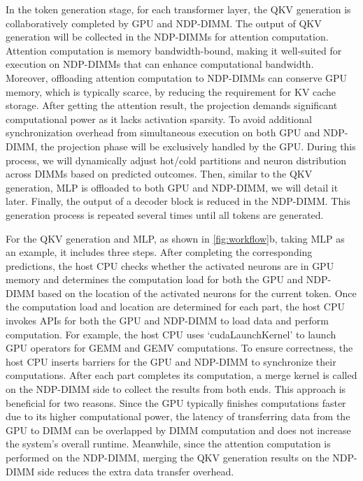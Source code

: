 In the token generation stage, for each transformer layer, the QKV generation is collaboratively completed by GPU and NDP-DIMM. The output of QKV generation will be collected in the NDP-DIMMs for attention computation. 
Attention computation is memory bandwidth-bound, making it well-suited for execution on NDP-DIMMs that can enhance computational bandwidth. Moreover, offloading attention computation to NDP-DIMMs can conserve GPU memory, which is typically scarce, by reducing the requirement for KV cache storage.
After getting the attention result, the projection demands significant computational power as it lacks activation sparsity. To avoid additional synchronization overhead from simultaneous execution on both GPU and NDP-DIMM, the projection phase will be exclusively handled by the GPU. 
During this process, we will dynamically adjust hot/cold partitions and neuron distribution across DIMMs based on predicted outcomes. Then, similar to the QKV generation, MLP is offloaded to both GPU and NDP-DIMM, we will detail it later. 
Finally, the output of a decoder block is reduced in the NDP-DIMM. 
This generation process is repeated several times until all tokens are generated.

For the QKV generation and MLP, as shown in \fig \ref{fig:workflow}b, taking MLP as an example, it includes three steps.
After completing the corresponding predictions, the host CPU checks whether the activated neurons are in GPU memory and determines the computation load for both the GPU and NDP-DIMM based on the location of the activated neurons for the current token.
Once the computation load and location are determined for each part, the host CPU invokes APIs for both the GPU and NDP-DIMM to load data and perform computation.
For example, the host CPU uses `cudaLaunchKernel' to launch GPU operators for GEMM and GEMV computations. To ensure correctness, the host CPU inserts barriers for the GPU and NDP-DIMM to synchronize their computations. 
After each part completes its computation, a merge kernel is called on the NDP-DIMM side to collect the results from both ends. 
This approach is beneficial for two reasons. Since the GPU typically finishes computations faster due to its higher computational power, the latency of transferring data from the GPU to DIMM can be overlapped by DIMM computation and does not increase the system's overall runtime.
Meanwhile, since the attention computation is performed on the NDP-DIMM, merging the QKV generation results on the NDP-DIMM side reduces the extra data transfer overhead.

